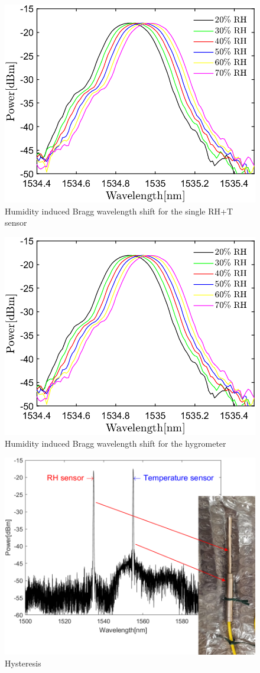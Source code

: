 \begin{figure}[!h]
\centering
\includegraphics[width=0.6\columnwidth]{Chapter5/images/rh.png}
\caption{Humidity induced Bragg wavelength shift for the single RH+T sensor}
\label{fig_single_wavelength}
\end{figure}


\begin{figure}[!h]
\centering
\includegraphics[width=0.6\columnwidth]{Chapter5/images/rh.png}
\caption{Humidity induced Bragg wavelength shift for the hygrometer}
\label{fig_single_wavelength}
\end{figure}


\begin{figure}[!h]
\centering
\includegraphics[width=0.6\columnwidth]{Chapter5/images/hygr.png}
\caption{Hysteresis}
\label{fig_hygrometer1}
\end{figure}


